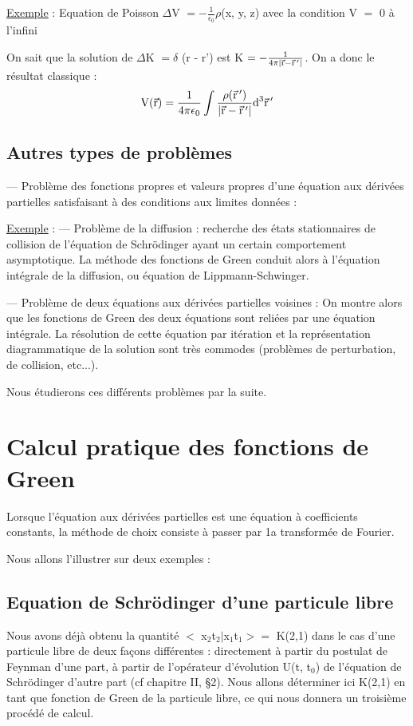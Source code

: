 \ul{Exemple} : Equation de Poisson $\Delta$V $=-\frac{1}{\epsilon_0}\rho$(x, y, z)
avec la condition V $=$ 0 à l'infini

On sait que la solution de $\Delta$K $=\delta$ (r - r') est K $=-\frac{1}{4\pi|\vec{\text{r}}-\vec{\text{r}}\,'|}$.
On a donc le résultat classique :
\[
\text{V}(\vec{\text{r}})=\frac{1}{4\pi\epsilon_0}
\int\frac{\rho(\vec{\text{r}}\,')}{|\vec{\text{r}}-\vec{\text{r}}\,'|}\text{d}^3\vec{\text{r}}\,'
\]

\subsection{Autres types de problèmes}%

— Problème des fonctions propres et valeurs propres d'une
équation aux dérivées partielles satisfaisant à des conditions aux limites
données :

\ul{Exemple} : — Problème de la diffusion : recherche des états stationnaires de
collision de l'équation de Schrödinger ayant un certain comportement
asymptotique. La méthode des fonctions de Green conduit alors à l'équation
intégrale de la diffusion, ou équation de Lippmann-Schwinger.

— Problème de deux équations aux dérivées partielles voisines :
On montre alors que les fonctions de Green des deux équations sont reliées
par une équation intégrale. La résolution de cette équation par itération
et la représentation diagrammatique de la solution sont très commodes
(problèmes de perturbation, de collision, etc...).

Nous étudierons ces différents problèmes par la suite.

\section{Calcul pratique des fonctions de Green}%

Lorsque l'équation aux dérivées partielles est une équation à
coefficients constants, la méthode de choix consiste à passer par 1a
transformée de Fourier.

Nous allons l'illustrer sur deux exemples :

\subsection{Equation de Schrödinger d'une particule libre}%

Nous avons déjà obtenu la quantité $<$ x$_2$t$_2|$x$_1$t$_1> =$ K(2,1)
dans le cas d'une particule libre de deux façons différentes : directement
à partir du postulat de Feynman d'une part, à partir de l'opérateur d'évolution
U(t, t$_0$) de l'équation de Schrödinger d'autre part (cf chapitre II,
\S 2). Nous allons déterminer ici K(2,1) en tant que fonction
de Green de la particule libre, ce qui nous donnera un troisième procédé
de calcul.


